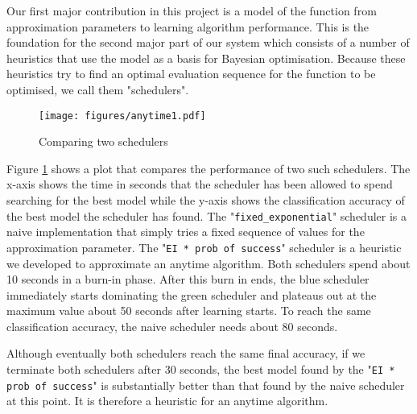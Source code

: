 \documentclass[a4paper,12pt,twoside,openright]{report}
\begin{document}
Our first major contribution in this project is a model of the function from approximation parameters to learning algorithm performance. This is the foundation for the second major part of our system which consists of a number of heuristics that use the model as a basis for Bayesian optimisation. Because these heuristics try to find an optimal evaluation sequence for the function to be optimised, we call them "schedulers".

\begin{figure}
\centering
  \texttt{[image: figures/anytime1.pdf]}
  \caption{Comparing two schedulers}
  \label{anytime1}
\end{figure}

Figure \ref{anytime1} shows a plot that compares the performance of two such schedulers. The x-axis shows the time in seconds that the scheduler has been allowed to spend searching for the best model while the y-axis shows the classification accuracy of the best model the scheduler has found. The "\texttt{fixed\_exponential}" scheduler is a naive implementation that simply tries a fixed sequence of values for the approximation parameter. The "\texttt{EI * prob of success}" scheduler is a heuristic we developed to approximate an anytime algorithm. Both schedulers spend about 10 seconds in a burn-in phase. After this burn in ends, the blue scheduler immediately starts dominating the green scheduler and plateaus out at the maximum value about 50 seconds after learning starts. To reach the same classification accuracy, the naive scheduler needs about 80 seconds.

Although eventually both schedulers reach the same final accuracy, if we terminate both schedulers after 30 seconds, the best model found by the "\texttt{EI * prob of success}" is substantially better than that found by the naive scheduler at this point. It is therefore a heuristic for an anytime algorithm.
\end{document}
